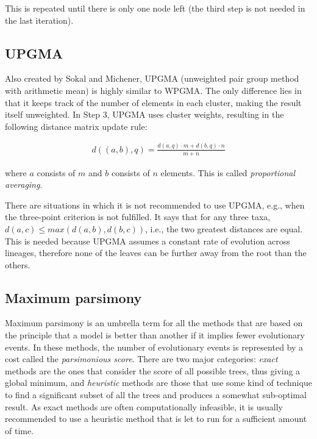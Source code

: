 \documentclass[11pt,twocolumn]{article}
\begin{document}
This is repeated until there is only one node left (the third step is not needed in the last iteration).

\subsection*{UPGMA}

Also created by Sokal and Michener, UPGMA (unweighted pair group method with arithmetic mean) is highly similar to WPGMA. The only difference lies in that it keeps track of the number of elements in each cluster, making the result itself unweighted. In Step 3, UPGMA uses cluster weights, resulting in the following distance matrix update rule:

\begin{align}
d((a, b), q) = \frac{d(a, q) \cdot m + d(b, q) \cdot n}{m + n}
\end{align}

where $a$ consists of $m$ and $b$ consists of $n$ elements. This is called \textit{proportional averaging}.

There are situations in which it is not recommended to use UPGMA, e.g., when the three-point criterion is not fulfilled. It says that for any three taxa, $d(a, c) \le max(d(a, b), d(b, c))$, i.e., the two greatest distances are equal. This is needed because UPGMA assumes a constant rate of evolution across lineages, therefore none of the leaves can be further away from the root than the others.

\subsection*{Maximum parsimony}

Maximum parsimony is an umbrella term for all the methods that are based on the principle that a model is better than another if it implies fewer evolutionary events. In these methods, the number of evolutionary events is represented by a cost called the \textit{parsimonious score}. There are two major categories: \textit{exact} methods are the ones that consider the score of all possible trees, thus giving a global minimum, and \textit{heuristic} methods are those that use some kind of technique to find a significant subset of all the trees and produces a somewhat sub-optimal result. As exact methods are often computationally infeasible, it is usually recommended to use a heuristic method that is let to run for a sufficient amount of time.
\end{document}
